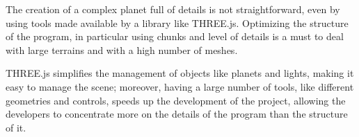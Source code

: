 \documentclass[paper=a4, fontsize=11pt]{scrartcl} %
\numberwithin{equation}{section} %
\numberwithin{figure}{section} %
\numberwithin{table}{section} %
\theoremstyle{definition}
\begin{document}
The creation of a complex planet full of details is not straightforward, even
by using tools made available by a library like THREE.js. Optimizing the structure of the program, in particular using chunks and
level of details is a must to deal with large terrains and with a high number
of meshes.

THREE.js simplifies the management of objects like planets and lights, making
it easy to manage the scene; moreover, having a large number of tools, like
different geometries and controls, speeds up the development of the project,
allowing the developers to concentrate more on the details of the program
than the structure of it.


\newpage



\end{document}
